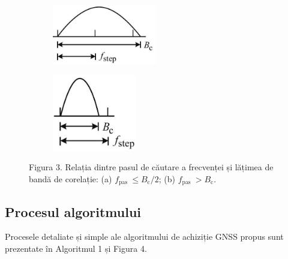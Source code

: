 \documentclass[10pt]{report}
\begin{document}
\begin{figure}[h]
    \centering
    \begin{subfigure}[b]{0.4\textwidth}
        \centering
        \includegraphics[width=0.5\textwidth]{2023_06_04_7690788c3d6419e4c10eg-5(1).jpg}
        \caption{}
    \end{subfigure}
    \begin{subfigure}[b]{0.4\textwidth}
        \centering
        \includegraphics[width=0.4\textwidth]{2023_06_04_7690788c3d6419e4c10eg-5.jpg}
        \caption{}
    \end{subfigure}
    \caption*{Figura 3. Relația dintre pasul de căutare a frecvenței și lățimea de bandă de corelație: (a) \(f_{\text {pas }} \leq B_{\mathrm{c}} / 2\); (b) \(f_{\text {pas }}>B_{\mathrm{c}}\).
    }
\end{figure}

\subsection*{Procesul algoritmului}
Procesele detaliate și simple ale algoritmului de achiziție GNSS propus sunt prezentate în Algoritmul 1 și Figura 4.
\end{document}
